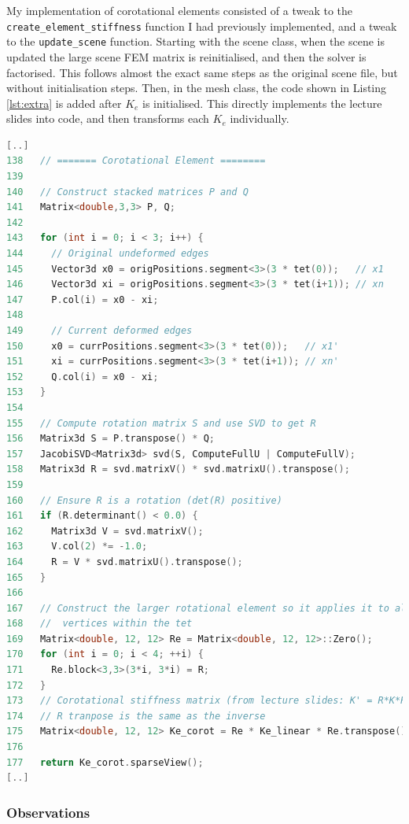 \documentclass[11pt,a4paper]{article}
\renewcommand{\t}[1]{\texttt{#1}}
\begin{document}
My implementation of corotational elements consisted of a tweak to the \texttt{create\_element\_stiffness} function I had previously implemented, and a tweak to the \texttt{update\_scene} function. 
Starting with the scene class, when the scene is updated the large scene FEM matrix is reinitialised, and then the solver is factorised. 
This follows almost the exact same steps as the original scene file, but without initialisation steps. 
Then, in the mesh class, the code shown in Listing \ref{lst:extra} is added after $K_{e}$ is initialised.
This directly implements the lecture slides into code, and then transforms each $K_{e}$ individually.
\begin{lstlisting}[language=C++, style=BugHunterExact, caption={Source file: \t{mesh\_section3.h}, Function: \t{create\_element\_stiffness()}}, label={lst:extra}]
[..]
138   // ======= Corotational Element ========
139
140   // Construct stacked matrices P and Q
141   Matrix<double,3,3> P, Q;
142
143   for (int i = 0; i < 3; i++) {
144     // Original undeformed edges
145     Vector3d x0 = origPositions.segment<3>(3 * tet(0));   // x1
146     Vector3d xi = origPositions.segment<3>(3 * tet(i+1)); // xn
147     P.col(i) = x0 - xi; 
148            
149     // Current deformed edges
150     x0 = currPositions.segment<3>(3 * tet(0));   // x1'
151     xi = currPositions.segment<3>(3 * tet(i+1)); // xn'
152     Q.col(i) = x0 - xi;
153   }
154 
155   // Compute rotation matrix S and use SVD to get R 
156   Matrix3d S = P.transpose() * Q;
157   JacobiSVD<Matrix3d> svd(S, ComputeFullU | ComputeFullV);
158   Matrix3d R = svd.matrixV() * svd.matrixU().transpose();
159         
160   // Ensure R is a rotation (det(R) positive)
161   if (R.determinant() < 0.0) {
162     Matrix3d V = svd.matrixV();
163     V.col(2) *= -1.0;
164     R = V * svd.matrixU().transpose();
165   }
166 
167   // Construct the larger rotational element so it applies it to all 
168   //  vertices within the tet
169   Matrix<double, 12, 12> Re = Matrix<double, 12, 12>::Zero();
170   for (int i = 0; i < 4; ++i) {
171     Re.block<3,3>(3*i, 3*i) = R;
172   }
173   // Corotational stiffness matrix (from lecture slides: K' = R*K*R^-1)
174   // R tranpose is the same as the inverse 
175   Matrix<double, 12, 12> Ke_corot = Re * Ke_linear * Re.transpose();
176 
177   return Ke_corot.sparseView();
[..]
\end{lstlisting}


\subsubsection*{Observations}
\end{document}

